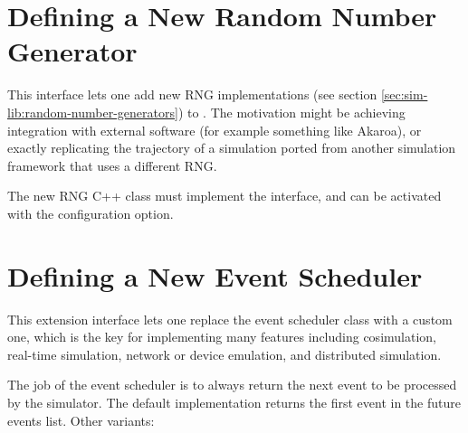 \section{Defining a New Random Number Generator}
\label{sec:plugin-exts:rng}

This interface lets one add new RNG implementations (see section
\ref{sec:sim-lib:random-number-generators}) to {\opp}.
The motivation might be achieving integration with external software (for
example something like Akaroa), or exactly replicating the trajectory of a
simulation ported from another simulation framework that uses a different
RNG.

The new RNG C++ class must implement the  interface,
and can be activated with the  configuration option.


\section{Defining a New Event Scheduler}
\label{sec:plugin-exts:scheduler}

This extension interface lets one replace the event scheduler class with a
custom one, which is the key for implementing many features including
cosimulation, real-time simulation, network or device emulation, and
distributed simulation.

The job of the event scheduler is to always return the next event to be
processed by the simulator. The default implementation returns the first
event in the future events list. Other variants:


